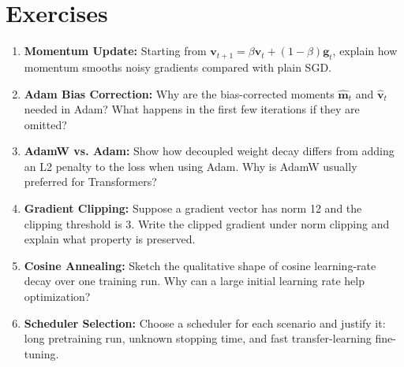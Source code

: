 \section{Exercises}

\begin{enumerate}
    \item \textbf{Momentum Update:} Starting from $\mathbf{v}_{t+1} = \beta \mathbf{v}_t + (1-\beta)\mathbf{g}_t$, explain how momentum smooths noisy gradients compared with plain SGD.

    \item \textbf{Adam Bias Correction:} Why are the bias-corrected moments $\hat{\mathbf{m}}_t$ and $\hat{\mathbf{v}}_t$ needed in Adam? What happens in the first few iterations if they are omitted?

    \item \textbf{AdamW vs. Adam:} Show how decoupled weight decay differs from adding an L2 penalty to the loss when using Adam. Why is AdamW usually preferred for Transformers?

    \item \textbf{Gradient Clipping:} Suppose a gradient vector has norm 12 and the clipping threshold is 3. Write the clipped gradient under norm clipping and explain what property is preserved.

    \item \textbf{Cosine Annealing:} Sketch the qualitative shape of cosine learning-rate decay over one training run. Why can a large initial learning rate help optimization?

    \item \textbf{Scheduler Selection:} Choose a scheduler for each scenario and justify it: long pretraining run, unknown stopping time, and fast transfer-learning fine-tuning.
\end{enumerate}

